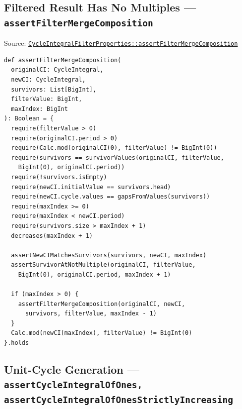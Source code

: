 \subsection{Filtered Result Has No Multiples --- \texorpdfstring{\texttt{assert\allowbreak Filter\allowbreak Merge\allowbreak Composition}}{assertFilterMergeComposition}}

{\raggedright Source: \href{https://github.com/thiagomata/prime-numbers/blob/integral-cycle-article-v1.0.0/src/main/scala/v1/chapter4/cycle/integral/recursive/properties/CycleIntegralFilterProperties.scala}{\texttt{Cycle\allowbreak Integral\allowbreak Filter\allowbreak Properties::assert\allowbreak Filter\allowbreak Merge\allowbreak Composition}}\par}

\begin{lstlisting}[style=scala]
def assertFilterMergeComposition(
  originalCI: CycleIntegral,
  newCI: CycleIntegral,
  survivors: List[BigInt],
  filterValue: BigInt,
  maxIndex: BigInt
): Boolean = {
  require(filterValue > 0)
  require(originalCI.period > 0)
  require(Calc.mod(originalCI(0), filterValue) != BigInt(0))
  require(survivors == survivorValues(originalCI, filterValue,
    BigInt(0), originalCI.period))
  require(!survivors.isEmpty)
  require(newCI.initialValue == survivors.head)
  require(newCI.cycle.values == gapsFromValues(survivors))
  require(maxIndex >= 0)
  require(maxIndex < newCI.period)
  require(survivors.size > maxIndex + 1)
  decreases(maxIndex + 1)

  assertNewCIMatchesSurvivors(survivors, newCI, maxIndex)
  assertSurvivorAtNotMultiple(originalCI, filterValue,
    BigInt(0), originalCI.period, maxIndex + 1)

  if (maxIndex > 0) {
    assertFilterMergeComposition(originalCI, newCI,
      survivors, filterValue, maxIndex - 1)
  }
  Calc.mod(newCI(maxIndex), filterValue) != BigInt(0)
}.holds
\end{lstlisting}

\subsection{Unit-Cycle Generation --- \texorpdfstring{\texttt{assert\allowbreak Cycle\allowbreak Integral\allowbreak Of\allowbreak Ones,}\\
\texttt{assert\allowbreak Cycle\allowbreak Integral\allowbreak Of\allowbreak Ones\allowbreak Strictly\allowbreak Increasing}}{assertCycleIntegralOfOnes, assertCycleIntegralOfOnesStrictlyIncreasing}}

